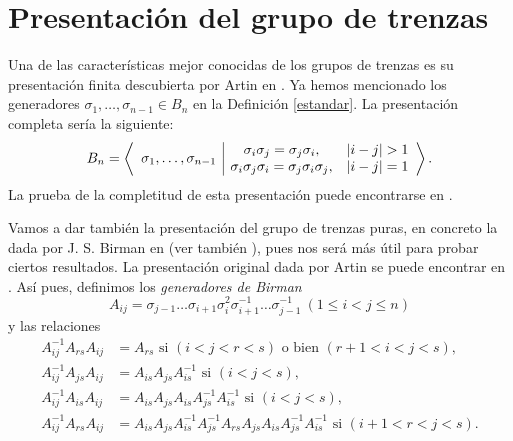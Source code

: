 \documentclass[TFG.tex]{subfiles}
\begin{document}

\newpage

\section{Presentación del grupo de trenzas}
Una de las características mejor conocidas de los grupos de trenzas es su presentación finita descubierta por Artin en \cite{Artin}. Ya hemos mencionado los generadores $\sigma_1,\dots,\sigma_{n-1}\in B_n$ en la Definición \ref{estandar}. La presentación completa sería la siguiente:
\begin{equation}\label{presentacion}
B_n=\left\langle\begin{array}{c| c c}
\multirow{2}{*}{$\sigma_1,\dots,\sigma_{n-1}$} & \sigma_i\sigma_j=\sigma_j\sigma_i, & |i-j|>1\\
& \sigma_i\sigma_j\sigma_i=\sigma_j\sigma_i\sigma_j, & |i-j|=1
\end{array}\right\rangle.
\end{equation}
La prueba de la completitud de esta presentación puede encontrarse en \cite{Magnus}. 

Vamos a dar también la presentación del grupo de trenzas puras, en concreto la dada por J. S. Birman en \cite{Birman} (ver también \cite{polynomial}), pues nos será más útil para probar ciertos resultados. La presentación original dada por Artin se puede encontrar en \cite{Artin}. Así pues, definimos los \emph{generadores de Birman}
\begin{equation}\label{birman}
A_{ij}=\sigma_{j-1}\dots\sigma_{i+1}\sigma_i^2\sigma_{i+1}^{-1}\dots\sigma_{j-1}^{-1}\ (1\leq i<j\leq n)
\end{equation}
y las relaciones %
\begin{align*}
A_{ij}^{-1}A_{rs}A_{ij}&=A_{rs}\text{ si } (i<j<r<s)\text{ o bien } (r+1<i<j<s),\\
A_{ij}^{-1}A_{js}A_{ij}&=A_{is}A_{js}A_{is}^{-1} \text{ si } (i<j<s),\\
A_{ij}^{-1}A_{is}A_{ij}&=A_{is}A_{js}A_{is}A_{js}^{-1}A_{is}^{-1}\text{ si } (i<j<s),\\
A_{ij}^{-1}A_{rs}A_{ij}&=A_{is}A_{js}A_{is}^{-1}A_{js}^{-1}A_{rs}A_{js}A_{is}A_{js}^{-1}A_{is}^{-1}\text{ si } (i+1<r<j<s).
\end{align*}
\end{document}
